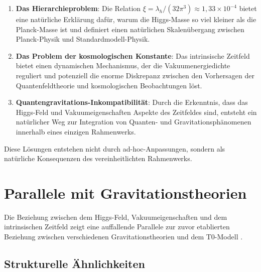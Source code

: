 \documentclass[12pt,a4paper]{article}
\begin{document}
	\begin{enumerate}
		\item \textbf{Das Hierarchieproblem}: Die Relation $\xi = \lambda_h/(32\pi^3) \approx 1,33 \times 10^{-4}$ bietet eine natürliche Erklärung dafür, warum die Higgs-Masse so viel kleiner als die Planck-Masse ist und definiert einen natürlichen Skalenübergang zwischen Planck-Physik und Standardmodell-Physik.
		
		\item \textbf{Das Problem der kosmologischen Konstante}: Das intrinsische Zeitfeld bietet einen dynamischen Mechanismus, der die Vakuumenergiedichte reguliert und potenziell die enorme Diskrepanz zwischen den Vorhersagen der Quantenfeldtheorie und kosmologischen Beobachtungen löst.
		
		\item \textbf{Quantengravitations-Inkompatibilität}: Durch die Erkenntnis, dass das Higgs-Feld und Vakuumeigenschaften Aspekte des Zeitfeldes sind, entsteht ein natürlicher Weg zur Integration von Quanten- und Gravitationsphänomenen innerhalb eines einzigen Rahmenwerks.
	\end{enumerate}
	
	Diese Lösungen entstehen nicht durch ad-hoc-Anpassungen, sondern als natürliche Konsequenzen des vereinheitlichten Rahmenwerks.
	
	\section{Parallele mit Gravitationstheorien}
	\label{sec:parallel_gravitation}
	
	Die Beziehung zwischen dem Higgs-Feld, Vakuumeigenschaften und dem intrinsischen Zeitfeld zeigt eine auffallende Parallele zur zuvor etablierten Beziehung zwischen verschiedenen Gravitationstheorien und dem T0-Modell \cite{pascher_completetheory_2025}.
	
	\subsection{Strukturelle Ähnlichkeiten}
	\label{subsec:structural_similarities}
	
\end{document}
